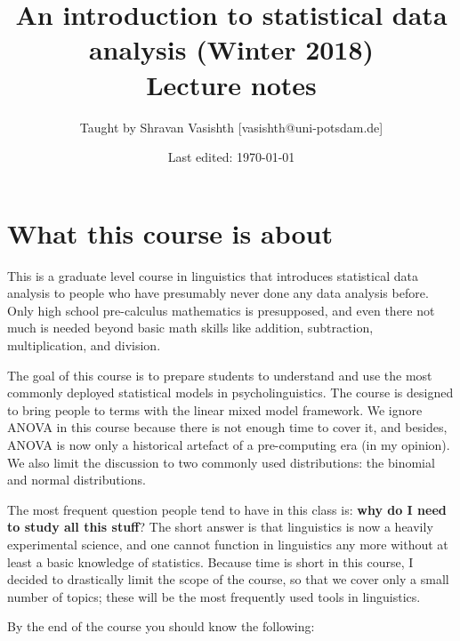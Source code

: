 \documentclass[12pt]{book}
\begin{document}



\author{Taught by Shravan Vasishth [vasishth@uni-potsdam.de]}
\title{An introduction to statistical data analysis (Winter 2018)\\ Lecture notes}
\date{Last edited: \today}
\maketitle

\frontmatter

\tableofcontents

\mainmatter


\chapter{What this course is about}

This is a graduate level course in linguistics that introduces statistical data analysis to people who have presumably never done any data analysis before. Only high school pre-calculus mathematics is presupposed, and even there not much is needed beyond basic math skills like addition, subtraction, multiplication, and division.

The goal of this course is to prepare students to understand and use the most commonly deployed statistical models in psycholinguistics. The course is designed to bring people to terms with the linear mixed model framework. We ignore ANOVA in this course because there is not enough time to cover it, and besides, ANOVA is now only a historical artefact of a pre-computing era (in my opinion). We also limit the discussion to two commonly used distributions: the binomial and normal distributions.

The most frequent question people tend to have in this class is: \textbf{why do I need to study all this stuff}? The short answer is that linguistics is now a heavily experimental science, and one cannot function in linguistics any more without at least a basic knowledge of statistics. 
Because time is short in this course, I decided to drastically limit the scope of the course, so that we cover only a small number of topics; these will be the most frequently used tools in linguistics.

By the end of the course you should know the following:
\end{document}
